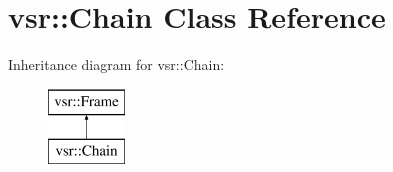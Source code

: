 \hypertarget{classvsr_1_1_chain}{\section{vsr\-:\-:Chain Class Reference}
\label{classvsr_1_1_chain}
}
Inheritance diagram for vsr\-:\-:Chain\-:\begin{figure}[H]
\begin{center}
\leavevmode
\includegraphics[height=2.000000cm]{classvsr_1_1_chain}
\end{center}
\end{figure}
